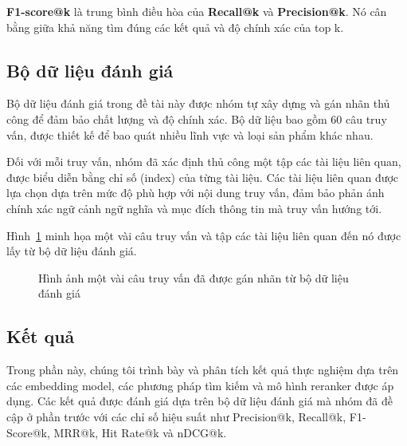 \documentclass{article}
\numberwithin{equation}{section}
\numberwithin{equation}{section}
\begin{document}
\textbf{F1-score@k} là trung bình điều hòa của \textbf{Recall@k} và \textbf{Precision@k}. Nó cân bằng giữa khả năng tìm đúng các kết quả và độ chính xác của top k.

\subsection{Bộ dữ liệu đánh giá}
Bộ dữ liệu đánh giá trong đề tài này được nhóm tự xây dựng và gán nhãn thủ công để đảm bảo chất lượng và độ chính xác. Bộ dữ liệu bao gồm 60 câu truy vấn, được thiết kế để bao quát nhiều lĩnh vực và loại sản phẩm khác nhau.

Đối với mỗi truy vấn, nhóm đã xác định thủ công một tập các tài liệu liên quan, được biểu diễn bằng chỉ số (index) của từng tài liệu. Các tài liệu liên quan được lựa chọn dựa trên mức độ phù hợp với nội dung truy vấn, đảm bảo phản ánh chính xác ngữ cảnh ngữ nghĩa và mục đích thông tin mà truy vấn hướng tới.

Hình~\ref{fig:evaluation_data} minh họa một vài câu truy vấn và tập các tài liệu liên quan đến nó được lấy từ bộ dữ liệu đánh giá.

\begin{figure}[!ht]
    \centering
    \caption{Hình ảnh một vài câu truy vấn đã được gán nhãn từ bộ dữ liệu đánh giá}
    \label{fig:evaluation_data}
\end{figure}

\subsection{Kết quả}
Trong phần này, chúng tôi trình bày và phân tích kết quả thực nghiệm dựa trên các embedding model, các phương pháp tìm kiếm và mô hình reranker được áp dụng. Các kết quả được đánh giá dựa trên bộ dữ liệu đánh giá mà nhóm đã đề cập ở phần trước với các chỉ số hiệu suất như Precision@k, Recall@k, F1-Score@k, MRR@k, Hit Rate@k và nDCG@k.
\end{document}
